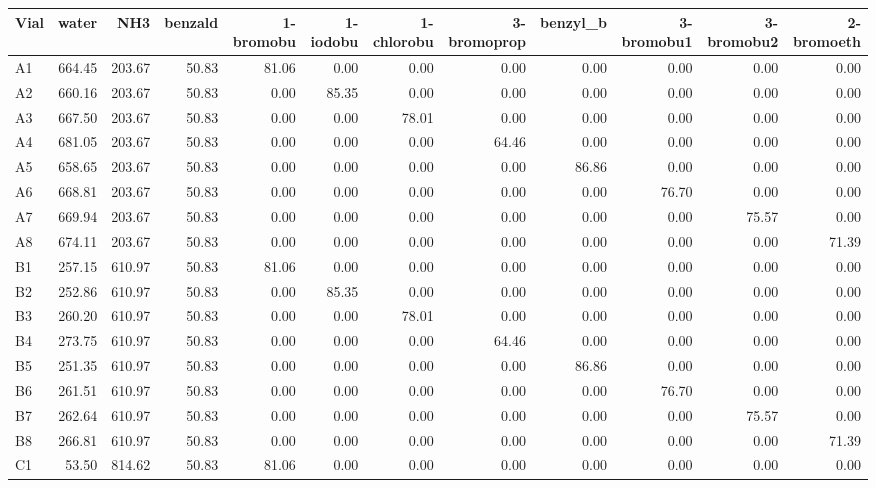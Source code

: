 \documentclass[sn-nature, twocolumn]{sn-jnl}%
\theoremstyle{thmstyleone}%
\theoremstyle{thmstyletwo}%
\theoremstyle{thmstylethree}%
\begin{document}
\begin{table}[!htb]
    \centering
    \scriptsize
\begin{tabular}{lrrrrrrrrrrr}
\toprule
Vial & water & NH3 & benzald & 1-bromobu & 1-iodobu & 1-chlorobu & 3-bromoprop & benzyl\_b & 3-bromobu1 & 3-bromobu2 & 2-bromoeth \\
\midrule
A1 & 664.45 & 203.67 & 50.83 & 81.06 & 0.00 & 0.00 & 0.00 & 0.00 & 0.00 & 0.00 & 0.00 \\
A2 & 660.16 & 203.67 & 50.83 & 0.00 & 85.35 & 0.00 & 0.00 & 0.00 & 0.00 & 0.00 & 0.00 \\
A3 & 667.50 & 203.67 & 50.83 & 0.00 & 0.00 & 78.01 & 0.00 & 0.00 & 0.00 & 0.00 & 0.00 \\
A4 & 681.05 & 203.67 & 50.83 & 0.00 & 0.00 & 0.00 & 64.46 & 0.00 & 0.00 & 0.00 & 0.00 \\
A5 & 658.65 & 203.67 & 50.83 & 0.00 & 0.00 & 0.00 & 0.00 & 86.86 & 0.00 & 0.00 & 0.00 \\
A6 & 668.81 & 203.67 & 50.83 & 0.00 & 0.00 & 0.00 & 0.00 & 0.00 & 76.70 & 0.00 & 0.00 \\
A7 & 669.94 & 203.67 & 50.83 & 0.00 & 0.00 & 0.00 & 0.00 & 0.00 & 0.00 & 75.57 & 0.00 \\
A8 & 674.11 & 203.67 & 50.83 & 0.00 & 0.00 & 0.00 & 0.00 & 0.00 & 0.00 & 0.00 & 71.39 \\
B1 & 257.15 & 610.97 & 50.83 & 81.06 & 0.00 & 0.00 & 0.00 & 0.00 & 0.00 & 0.00 & 0.00 \\
B2 & 252.86 & 610.97 & 50.83 & 0.00 & 85.35 & 0.00 & 0.00 & 0.00 & 0.00 & 0.00 & 0.00 \\
B3 & 260.20 & 610.97 & 50.83 & 0.00 & 0.00 & 78.01 & 0.00 & 0.00 & 0.00 & 0.00 & 0.00 \\
B4 & 273.75 & 610.97 & 50.83 & 0.00 & 0.00 & 0.00 & 64.46 & 0.00 & 0.00 & 0.00 & 0.00 \\
B5 & 251.35 & 610.97 & 50.83 & 0.00 & 0.00 & 0.00 & 0.00 & 86.86 & 0.00 & 0.00 & 0.00 \\
B6 & 261.51 & 610.97 & 50.83 & 0.00 & 0.00 & 0.00 & 0.00 & 0.00 & 76.70 & 0.00 & 0.00 \\
B7 & 262.64 & 610.97 & 50.83 & 0.00 & 0.00 & 0.00 & 0.00 & 0.00 & 0.00 & 75.57 & 0.00 \\
B8 & 266.81 & 610.97 & 50.83 & 0.00 & 0.00 & 0.00 & 0.00 & 0.00 & 0.00 & 0.00 & 71.39 \\
C1 & 53.50 & 814.62 & 50.83 & 81.06 & 0.00 & 0.00 & 0.00 & 0.00 & 0.00 & 0.00 & 0.00 \\

\end{tabular}
\end{table}
\end{document}
